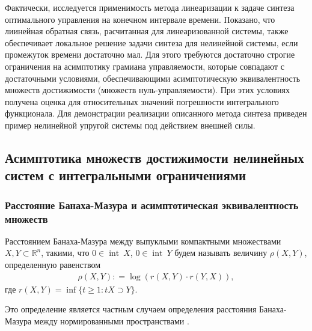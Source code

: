 \documentclass[../main.tex]{subfiles}
\begin{document}
Фактически, исследуется применимость метода линеаризации к задаче синтеза оптимального управления на конечном интервале времени. 
Показано, что лиинейная обратная связь, расчитанная для линеаризованной системы, также обеспечивает локальное решение задачи синтеза для нелинейной системы, если промежуток времени достаточно мал.   
Для этого требуются достаточно строгие ограничения на асимптотику грамиана управляемости, которые совпадают с достаточными условиями, обеспечивающими асимптотическую эквивалентность множеств достижимости (множеств нуль-управляемости). 
При этих условиях получена оценка для относительных значений погрешности интегрального функционала. 
Для демонстрации реализации описанного метода синтеза приведен пример нелинейной упругой системы под действием внешней силы. 


\subsection{Асимптотика множеств достижимости нелинейных систем с интегральными ограничениями} 


\subsubsection{Расстояние Банаха-Мазура и асимптотическая эквивалентность множеств}\label{sec21:AsymptoticEquality}

Расстоянием Банаха-Мазура между выпуклыми компактными множествами $ X,Y \subset \mathbb R^n $, такими, что $0 \in \operatorname{int}\ X$, $0 \in \operatorname{int}\ Y$ будем называть величину $ \rho (X, Y)  $, определенную равенством 
\begin{gather*}
    \rho (X, Y): = \log (r(X,Y) \cdot r(Y, X)),
\end{gather*}
где $r(X, Y) = \inf \{t \geq 1: tX \supset Y \}$.

Это определение является частным случаем определения расстояния Банаха-Мазура между нормированными пространствами \cite[Определение 2.4.6]{Thompson}.
\end{document}
